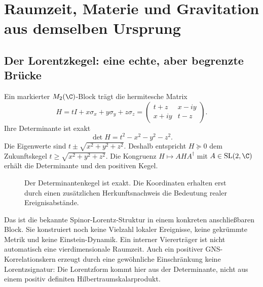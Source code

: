 \chapter{Raumzeit, Materie und Gravitation aus demselben Ursprung}
\label{ch:physik}
\section{Der Lorentzkegel: eine echte, aber begrenzte Brücke}
Ein markierter $M_2(\C)$-Block trägt die hermitesche Matrix
\begin{equation}
H=tI+x\sigma_x+y\sigma_y+z\sigma_z
=\begin{pmatrix}t+z&x-iy\\x+iy&t-z\end{pmatrix}.
\end{equation}
Ihre Determinante ist exakt
\begin{equation}
\det H=t^2-x^2-y^2-z^2.
\end{equation}
Die Eigenwerte sind $t\pm\sqrt{x^2+y^2+z^2}$. Deshalb entspricht $H\succeq0$ dem Zukunftskegel $t\ge\sqrt{x^2+y^2+z^2}$. Die Kongruenz $H\mapsto AHA^\dagger$ mit $A\in\mathrm{SL}(2,\C)$ erhält die Determinante und den positiven Kegel.

\begin{figure}[H]\centering
{}
\caption{Der Determinantenkegel ist exakt. Die Koordinaten erhalten erst durch einen zusätzlichen Herkunftsnachweis die Bedeutung realer Ereignisabstände.}
\end{figure}

Das ist die bekannte Spinor-Lorentz-Struktur in einem konkreten anschließbaren Block. Sie konstruiert noch keine Vielzahl lokaler Ereignisse, keine gekrümmte Metrik und keine Einstein-Dynamik. Ein interner Viererträger ist nicht automatisch eine vierdimensionale Raumzeit. Auch ein positiver GNS-Korrelationskern erzeugt durch eine gewöhnliche Einschränkung keine Lorentzsignatur: Die Lorentzform kommt hier aus der Determinante, nicht aus einem positiv definiten Hilbertraumskalarprodukt. 

